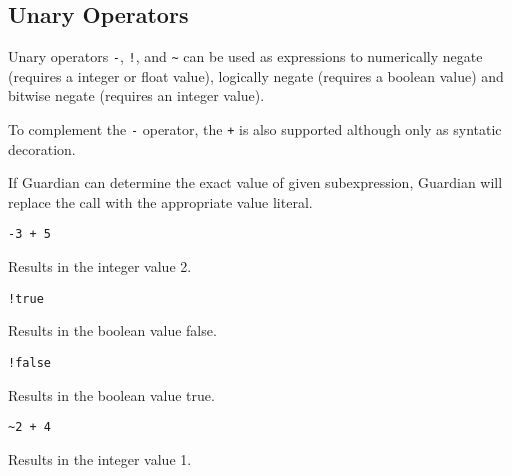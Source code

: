 
\subsection{Unary Operators}
{
	Unary operators \texttt{-}, \texttt{!},
	and \texttt{\~} can be used as expressions to
	numerically negate (requires a integer or float value),
	logically negate (requires a boolean value) and
	bitwise negate (requires an integer value).
	
	To complement the \texttt{-} operator, the \texttt{+} is also supported
	although only as syntatic decoration.
	
	If Guardian can determine the exact value of given subexpression,
	Guardian will replace the call with the appropriate value literal.
	
	\begin{itemize}
	{
		\item[] \lstinline[language=MAIA, columns=fixed]@-3 + 5@
		
			Results in the integer value 2.
		
		\item[] \lstinline[language=MAIA, columns=fixed]@!true@
		
			Results in the boolean value false.
		
		\item[] \lstinline[language=MAIA, columns=fixed]@!false@
		
			Results in the boolean value true.
		
		\item[] \lstinline[language=MAIA, columns=fixed]@~2 + 4@
		
			Results in the integer value 1.
	}
	\end{itemize}
}
